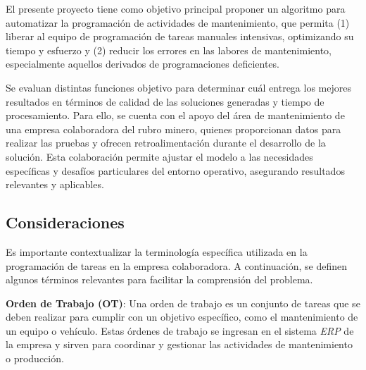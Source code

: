 \documentclass{article}
\begin{document}
El presente proyecto tiene como objetivo principal proponer un algoritmo para automatizar la programación de actividades de mantenimiento, que permita (1) liberar al equipo de programación de tareas manuales intensivas, optimizando su tiempo y esfuerzo y (2) reducir los errores en las labores de mantenimiento, especialmente aquellos derivados de programaciones deficientes. 

Se evaluan distintas funciones objetivo para determinar cuál entrega los mejores resultados en términos de calidad de las soluciones generadas y tiempo de procesamiento. Para ello, se cuenta con el apoyo del área de mantenimiento de una empresa colaboradora del rubro minero, quienes proporcionan datos para realizar las pruebas y ofrecen retroalimentación durante el desarrollo de la solución. Esta colaboración permite ajustar el modelo a las necesidades específicas y desafíos particulares del entorno operativo, asegurando resultados relevantes y aplicables.


\subsection{Consideraciones}
Es importante contextualizar la terminología específica utilizada en la programación de tareas en la empresa colaboradora. A continuación, se definen algunos términos relevantes para facilitar la comprensión del problema.


\textbf{Orden de Trabajo (OT)}: Una orden de trabajo es un conjunto de tareas que se deben realizar para cumplir con un objetivo específico, como el mantenimiento de un equipo o vehículo. Estas órdenes de trabajo se ingresan en el sistema \textit{ERP} de la empresa y sirven para coordinar y gestionar las actividades de mantenimiento o producción.

\end{document}
